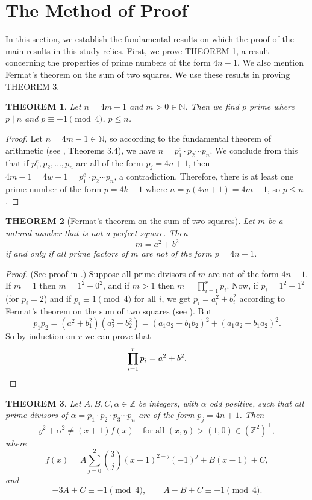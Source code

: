 \documentclass[11pt]{amsart}
\newtheorem{theorem}{THEOREM}
\begin{document}
\section{The Method of Proof}

In this section, we establish the fundamental results on which the proof of the main results in this study relies. First, we prove THEOREM 1, a result concerning the properties of prime numbers of the form $4n-1$. We also mention Fermat's theorem on the sum of two squares. We use these results in proving THEOREM 3.

\begin{theorem}\label{thm1}
Let $n=4m-1$ and $m>0\in\mathbb{N}$. Then we find $p$ prime where $p\mid n$ and $p\equiv -1\pmod 4$, $p\le n$.
\end{theorem}

\begin{proof}
Let $n=4m-1\in\mathbb{N}$, so according to the fundamental theorem of arithmetic (see \cite[Chp.\,1, p.\,83]{ref24}, Theorems 3,4), we have $n = p_1^{e}\cdot p_2\cdots p_n$. We conclude from this that if $p_1^{e},p_2,\dots,p_n$ are all of the form $p_j=4n+1$, then $4m-1 = 4w+1 = p_1^e\cdot p_2\cdots p_n$, a contradiction. Therefore, there is at least one prime number of the form $p=4k-1$ where $n=p(4w+1)=4m-1$, so $p\le n$.
\end{proof}

\begin{theorem}[Fermat's theorem on the sum of two squares]\label{thm2}
Let $m$ be a natural number that is not a perfect square. Then
\[
m = a^2+b^2
\]
if and only if all prime factors of $m$ are not of the form $p=4n-1$.
\end{theorem}

\begin{proof}
(See proof in \cite[Chp.\,8, p.\,242]{ref24}.) Suppose all prime divisors of $m$ are not of the form $4n-1$. If $m=1$ then $m=1^2+0^2$, and if $m>1$ then $m=\prod_{i=1}^r p_i$. Now, if $p_i=1^2+1^2$ (for $p_i=2$) and if $p_i\equiv 1\pmod 4$ for all $i$, we get $p_i = a_i^2+b_i^2$ according to Fermat's theorem on the sum of two squares (see \cite[Thm.\,15]{ref24}). But
\[
p_1p_2 = (a_1^2+b_1^2)(a_2^2+b_2^2) = (a_1a_2+b_1b_2)^2+(a_1a_2-b_1a_2)^2.
\]
So by induction on $r$ we can prove that
\[
\prod_{i=1}^r p_i = a^2+b^2. \qedhere
\]
\end{proof}

\begin{theorem}\label{thm3}
Let $A,B,C,\alpha\in\mathbb{Z}$ be integers, with $\alpha$ odd positive, such that all prime divisors of $\alpha = p_1\cdot p_2\cdot p_3\cdots p_n$ are of the form $p_j=4n+1$. Then
\[
y^2+\alpha^2 \ne (x+1)f(x) \quad \text{for all } (x,y) > (1,0) \in (\mathbb{Z}^2)^+,
\]
where
\[
f(x) = A\sum_{j=0}^2 \binom{3}{j}(x+1)^{2-j}(-1)^j + B(x-1)+C,
\]
and
\[
-3A+C\equiv -1\pmod 4, \qquad A-B+C\equiv -1\pmod 4.
\]
\end{theorem}
\end{document}
